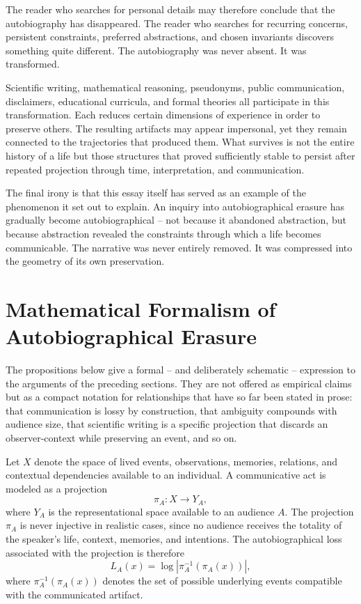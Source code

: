 \documentclass[11pt]{article}
\theoremstyle{plain}
\begin{document}
The reader who searches for personal details may therefore conclude that the autobiography has disappeared. The reader who searches for recurring concerns, persistent constraints, preferred abstractions, and chosen invariants discovers something quite different. The autobiography was never absent. It was transformed.

Scientific writing, mathematical reasoning, pseudonyms, public communication, disclaimers, educational curricula, and formal theories all participate in this transformation. Each reduces certain dimensions of experience in order to preserve others. The resulting artifacts may appear impersonal, yet they remain connected to the trajectories that produced them. What survives is not the entire history of a life but those structures that proved sufficiently stable to persist after repeated projection through time, interpretation, and communication.

The final irony is that this essay itself has served as an example of the phenomenon it set out to explain. An inquiry into autobiographical erasure has gradually become autobiographical -- not because it abandoned abstraction, but because abstraction revealed the constraints through which a life becomes communicable. The narrative was never entirely removed. It was compressed into the geometry of its own preservation.

\appendix

\section{Mathematical Formalism of Autobiographical Erasure}

The propositions below give a formal -- and deliberately schematic -- expression to the arguments of the preceding sections. They are not offered as empirical claims but as a compact notation for relationships that have so far been stated in prose: that communication is lossy by construction, that ambiguity compounds with audience size, that scientific writing is a specific projection that discards an observer-context while preserving an event, and so on.

Let $X$ denote the space of lived events, observations, memories, relations, and contextual dependencies available to an individual. A communicative act is modeled as a projection
\[
\pi_A : X \longrightarrow Y_A,
\]
where $Y_A$ is the representational space available to an audience $A$. The projection $\pi_A$ is never injective in realistic cases, since no audience receives the totality of the speaker's life, context, memories, and intentions. The autobiographical loss associated with the projection is therefore
\[
L_A(x) = \log \left| \pi_A^{-1}(\pi_A(x)) \right|,
\]
where $\pi_A^{-1}(\pi_A(x))$ denotes the set of possible underlying events compatible with the communicated artifact.
\end{document}

